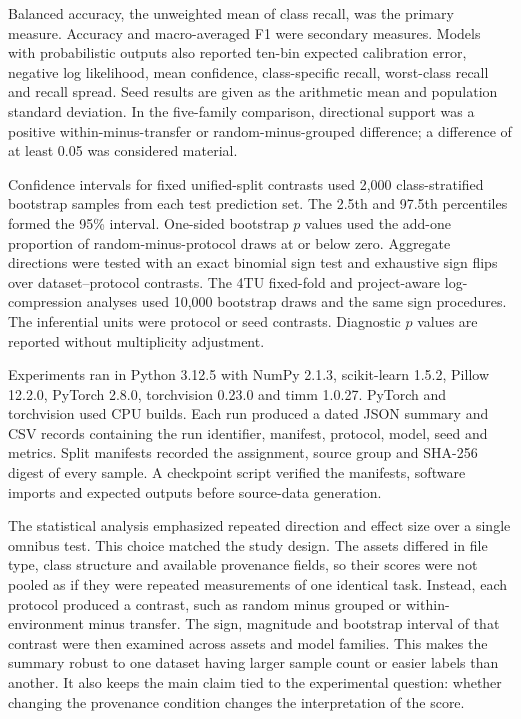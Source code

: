 \documentclass[]{interact}
\begin{document}
Balanced accuracy, the unweighted mean of class recall, was the primary measure. Accuracy and macro-averaged F1 were secondary measures. Models with probabilistic outputs also reported ten-bin expected calibration error, negative log likelihood, mean confidence, class-specific recall, worst-class recall and recall spread. Seed results are given as the arithmetic mean and population standard deviation. In the five-family comparison, directional support was a positive within-minus-transfer or random-minus-grouped difference; a difference of at least 0.05 was considered material.

Confidence intervals for fixed unified-split contrasts used 2,000 class-stratified bootstrap samples from each test prediction set. The 2.5th and 97.5th percentiles formed the 95\% interval. One-sided bootstrap $p$ values used the add-one proportion of random-minus-protocol draws at or below zero. Aggregate directions were tested with an exact binomial sign test and exhaustive sign flips over dataset--protocol contrasts. The 4TU fixed-fold and project-aware log-compression analyses used 10,000 bootstrap draws and the same sign procedures. The inferential units were protocol or seed contrasts. Diagnostic $p$ values are reported without multiplicity adjustment.

Experiments ran in Python 3.12.5 with NumPy 2.1.3, scikit-learn 1.5.2, Pillow 12.2.0, PyTorch 2.8.0, torchvision 0.23.0 and timm 1.0.27. PyTorch and torchvision used CPU builds. Each run produced a dated JSON summary and CSV records containing the run identifier, manifest, protocol, model, seed and metrics. Split manifests recorded the assignment, source group and SHA-256 digest of every sample. A checkpoint script verified the manifests, software imports and expected outputs before source-data generation.

The statistical analysis emphasized repeated direction and effect size over a single omnibus test. This choice matched the study design. The assets differed in file type, class structure and available provenance fields, so their scores were not pooled as if they were repeated measurements of one identical task. Instead, each protocol produced a contrast, such as random minus grouped or within-environment minus transfer. The sign, magnitude and bootstrap interval of that contrast were then examined across assets and model families. This makes the summary robust to one dataset having larger sample count or easier labels than another. It also keeps the main claim tied to the experimental question: whether changing the provenance condition changes the interpretation of the score.
\end{document}
